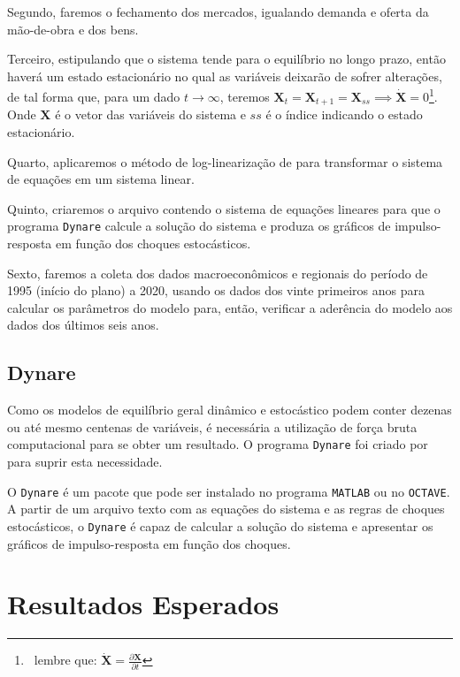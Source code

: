 \documentclass[12pt]{article}
\newcommand{\dynare}{\texttt{Dynare}}
\newcommand{\matlab}{\texttt{MATLAB}}
\newcommand{\octave}{\texttt{OCTAVE}}
\numberwithin{equation}{section}
\theoremstyle{definition}
\begin{document}
Segundo, faremos o fechamento dos mercados, igualando demanda e oferta da mão-de-obra e dos bens. 

Terceiro, estipulando que o sistema tende para o equilíbrio no longo prazo, então haverá um estado estacionário no qual as variáveis deixarão de sofrer alterações, de tal forma que, para um dado $t \longrightarrow \infty$, teremos $\boldsymbol{X}_t = \boldsymbol{X}_{t+1} = \boldsymbol{X}_{ss} \implies \boldsymbol{\dot{X}} = 0$\footnote{$\,$ lembre que: $\boldsymbol{\dot{X}} = \frac{\partial \boldsymbol{X}}{\partial t}$}. Onde $\boldsymbol{X}$ é o vetor das variáveis do sistema e $ss$ é o índice indicando o estado estacionário.

Quarto, aplicaremos o método de log-linearização de \textcite{uhlig_toolkit_1999} para transformar o sistema de equações em um sistema linear.

Quinto, criaremos o arquivo contendo o sistema de equações lineares para que o programa \dynare{} calcule a solução do sistema e produza os gráficos de impulso-resposta em função dos choques estocásticos.

Sexto, faremos a coleta dos dados macroeconômicos e regionais do período de 1995 (início do plano) a 2020, usando os dados dos vinte primeiros anos para calcular os parâmetros do modelo para, então, verificar a aderência do modelo aos dados dos últimos seis anos.

\subsection{Dynare} \label{sec:dynare}

Como os modelos de equilíbrio geral dinâmico e estocástico podem conter dezenas ou até mesmo centenas de variáveis, é necessária a utilização de força bruta computacional para se obter um resultado. O programa \dynare{} foi criado por \textcite{adjemian_dynare_2022} para suprir esta necessidade.

O \dynare{} é um pacote que pode ser instalado no programa \matlab{} ou no \octave{}. A partir de um arquivo texto com as equações do sistema e as regras de choques estocásticos, o \dynare{} é capaz de calcular a solução do sistema e apresentar os gráficos de impulso-resposta em função dos choques.

\newpage

\section{Resultados Esperados}\label{sec:resultadosEsperados}
\end{document}
